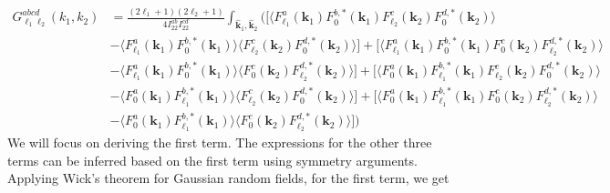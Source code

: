 \documentclass[a4paper,11pt]{article}
\begin{document}
\begin{align}
    G_{\ell_1 \ell_2}^{a b c d}(k_1, k_2) &= \frac{(2\ell_1 + 1)(2\ell_2 + 1)}{4I_{22}^{ab} I_{22}^{cd}}\int_{\hat{\boldsymbol{k}}_1, \hat{\boldsymbol{k}}_2} \Big(\Big[\big\langle F_{\ell_1}^a(\boldsymbol{k}_1) F_0^{b, *}(\boldsymbol{k}_1) F_{\ell_2}^c(\boldsymbol{k}_2) F_0^{d, *}(\boldsymbol{k}_2)\big\rangle \nonumber \\
    &- \langle F_{\ell_1}^a(\boldsymbol{k}_1)F_0^{b, *}(\boldsymbol{k}_1) \rangle \langle F_{\ell_2}^{c}(\boldsymbol{k}_2)F_0^{d, *}(\boldsymbol{k}_2) \big\rangle\Big] + \Big[\big\langle F_{\ell_1}^a(\boldsymbol{k}_1) F_0^{b, *}(\boldsymbol{k}_1) F_{0}^c(\boldsymbol{k}_2) F_{\ell_2}^{d, *}(\boldsymbol{k}_2)\big\rangle \nonumber \\
    &- \langle F_{\ell_1}^a(\boldsymbol{k}_1)F_0^{b, *}(\boldsymbol{k}_1) \rangle \langle F_{0}^{c}(\boldsymbol{k}_2)F_{\ell_2}^{d, *}(\boldsymbol{k}_2) \big\rangle\Big] + \Big[\big\langle F_{0}^a(\boldsymbol{k}_1) F_{\ell_1}^{b, *}(\boldsymbol{k}_1) F_{\ell_2}^c(\boldsymbol{k}_2) F_0^{d, *}(\boldsymbol{k}_2)\big\rangle \nonumber \\
    &- \langle F_{0}^a(\boldsymbol{k}_1)F_{\ell_1}^{b, *}(\boldsymbol{k}_1) \rangle \langle F_{\ell_2}^{c}(\boldsymbol{k}_2)F_0^{d, *}(\boldsymbol{k}_2) \big\rangle\Big] + \Big[\big\langle F_{0}^a(\boldsymbol{k}_1) F_{\ell_1}^{b, *}(\boldsymbol{k}_1) F_{0}^c(\boldsymbol{k}_2) F_{\ell_2}^{d, *}(\boldsymbol{k}_2)\big\rangle \nonumber \\
    &- \langle F_{0}^a(\boldsymbol{k}_1)F_{\ell_1}^{b, *}(\boldsymbol{k}_1) \rangle \langle F_{0}^{c}(\boldsymbol{k}_2)F_{\ell_2}^{d, *}(\boldsymbol{k}_2) \big\rangle\Big] \Big)
    \label{eq: G_expand}
\end{align}
We will focus on deriving the first term. The expressions for the other three terms can be inferred based on the first term using symmetry arguments. Applying Wick's theorem for Gaussian random fields, for the first term, we get 
\end{document}

